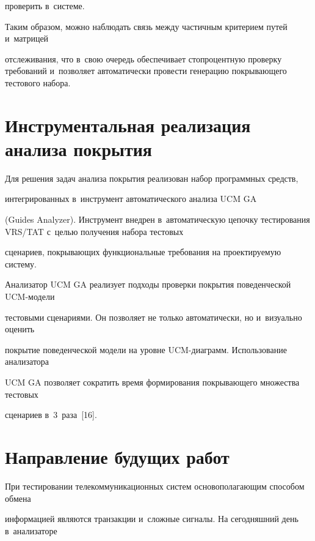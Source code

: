 проверить в~системе.



  Таким образом, можно наблюдать связь между частичным критерием путей и~матрицей

отслеживания, что в~свою очередь обеспечивает стопроцентную проверку требований и~позволяет автоматически провести генерацию покрывающего тестового набора.



\section{Инструментальная реализация анализа покрытия}



  Для решения задач анализа покрытия реализован набор программных средств,

интегрированных в~инструмент автоматического анализа UCM GA

(Guides Analyzer). Инструмент внедрен в~автоматическую цепочку тестирования VRS/TAT с~целью получения набора тестовых

сценариев, покрывающих функциональные требования на проектируемую систему.



  Анализатор UCM GA реализует подходы проверки покрытия поведенческой UCM-модели

тестовыми сценариями. Он позволяет не только автоматически, но и~визуально оценить

покрытие поведенческой модели на уровне UCM-диа\-грамм. Использование анализатора

UCM GA позволяет сократить время формирования покрывающего множества тестовых

сценариев в~3~раза~[16].



\vspace*{-4pt}



\section{Направление будущих работ}



\vspace*{-2pt}



  При тестировании телекоммуникационных систем основополагающим способом обмена

информацией являются транзакции и~сложные сигналы. На сегодняшний день в~анализаторе


